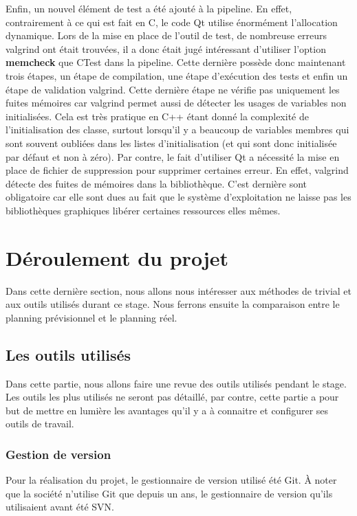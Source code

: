 \documentclass[a4paper]{article}
\begin{document}
Enfin, un nouvel élément de test a été ajouté à la pipeline. En effet,
contrairement à ce qui est fait en C, le code Qt utilise énormément l'allocation
dynamique. Lors de la mise en place de l'outil de test, de nombreuse erreurs
valgrind ont était trouvées, il a donc était jugé intéressant d'utiliser
l'option \textbf{memcheck} que CTest dans la pipeline. Cette dernière possède
donc maintenant trois étapes, un étape de compilation, une étape d'exécution des
tests et enfin un étape de validation valgrind. Cette dernière étape ne vérifie
pas uniquement les fuites mémoires car valgrind permet aussi de détecter les
usages de variables non initialisées. Cela est très pratique en C++ étant donné
la complexité de l'initialisation des classe, surtout lorsqu'il y a beaucoup de
variables membres qui sont souvent oubliées dans les listes d'initialisation (et
qui sont donc initialisée par défaut et non à zéro). Par contre, le fait
d'utiliser Qt a nécessité la mise en place de fichier de suppression pour
supprimer certaines erreur. En effet, valgrind détecte des fuites de mémoires
dans la bibliothèque. C'est dernière sont obligatoire car elle sont dues au fait
que le système d'exploitation ne laisse pas les bibliothèques graphiques libérer
certaines ressources elles mêmes.
\section{Déroulement du projet}%

Dans cette dernière section, nous allons nous intéresser aux méthodes de
trivial et aux outils utilisés durant ce stage. Nous ferrons ensuite la
comparaison entre le planning prévisionnel et le planning réel.

\subsection{Les outils utilisés}%

Dans cette partie, nous allons faire une revue des outils utilisés pendant le
stage. Les outils les plus utilisés ne seront pas détaillé, par contre, cette
partie a pour but de mettre en lumière les avantages qu'il y a à connaitre et
configurer ses outils de travail.

\subsubsection{Gestion de version}%

Pour la réalisation du projet, le gestionnaire de version utilisé été Git. À
noter que la société n'utilise Git que depuis un ans, le gestionnaire de version
qu'ils utilisaient avant été SVN.
\end{document}
